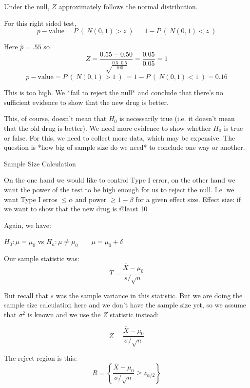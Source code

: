\documentclass[12pt]{article}
\begin{document}
Under the null, $Z$ approximately follows the normal distribution. 

For this right sided test, 
$$
p-\text{value} = P\ (\ N(0,1) > z\ )\ = 1 - P\ (\ N(0,1) < z\ )
$$

Here $\hat p = .55$ so
$$
Z = \frac{0.55 - 0.50} {\sqrt \frac{0.5 \; \; 0.5}{100}} = \frac{0.05}{0.05} = 1
$$
$$
p-\text{value} = P\ (\ N(0,1) > 1\ )\ = 1 - P\ (\ N(0,1) < 1\ ) = 0.16
$$

This is too high. We *fail to reject the null* and conclude that there's no sufficient evidence to show that the new drug is better.

This, of course, doesn't mean that $H_0$ is necessarily true (i.e. it doesn't mean that the old drug is better). We need more evidence to show whether $H_0$ is true or false. For this, we need to collect more data, which may be expensive. The question is *how big of sample size do we need* to conclude one way or another.  






Sample Size Calculation

On the one hand we would like to control Type I error, on the other hand we want the
power of the test to be high enough for us to reject the null. I.e. we want Type I erros  $\leq \alpha$ and power $\geq 1 - \beta$ for a given effect size. Effect size: if we want to show that the new drug is @least 10%

Again, we have:

 
 $H_0: \mu = \mu_0$  vs  
 $H_a: \mu \neq \mu_0 \; \; \; \; \; \; \; \mu = \mu_0 + \delta$   


Our sample statistic was:
$$
T = \frac{\bar X - \mu_0}{s/\sqrt n}
$$

But recall that $s$ was the sample variance in this statistic. But we are doing the sample size calculation here and we don't have the sample size yet, so we assume that
$\sigma^2$ is known and we use the $Z$ statistic instead:


$$
Z = \frac{\bar X - \mu_0}{\sigma/ \sqrt n}
$$

The reject region is this:
$$
R = \left\{ \frac{\bar X - \mu_0}{\sigma/ \sqrt n} \geq z_{\alpha/2} \right\}
$$
  
\end{document}
